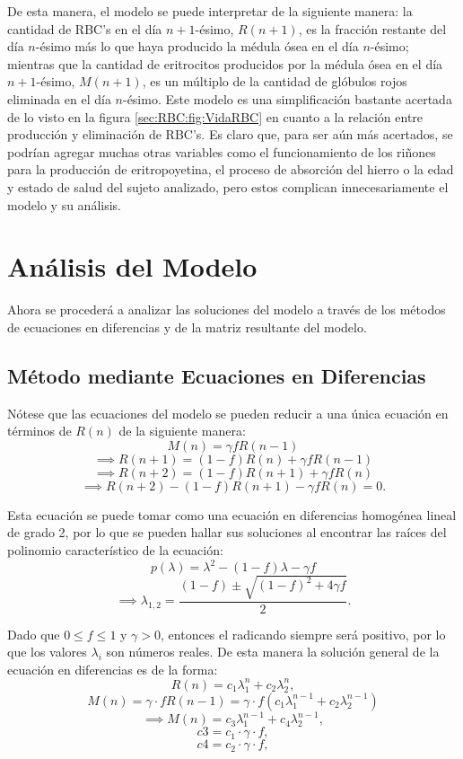 De esta manera, el modelo se puede interpretar de la siguiente manera: la cantidad de RBC's en el día $n+1$-ésimo, $R(n+1)$, es la fracción restante del día $n$-ésimo más lo que haya producido la médula ósea en el día $n$-ésimo; mientras que la cantidad de eritrocitos producidos por la médula ósea en el día $n+1$-ésimo, $M(n+1)$, es un múltiplo de la cantidad de glóbulos rojos eliminada en el día $n$-ésimo. Este modelo es una simplificación bastante acertada de lo visto en la figura \ref{sec:RBC:fig:VidaRBC} en cuanto a la relación entre producción y eliminación de RBC's. Es claro que, para ser aún más acertados, se podrían agregar muchas otras variables como el funcionamiento de los riñones para la producción de eritropoyetina, el proceso de absorción del hierro o la edad y estado de salud del sujeto analizado, pero estos complican innecesariamente el modelo y su análisis.

\section{Análisis del Modelo}\label{sec:modelo:analisis}

Ahora se procederá a analizar las soluciones del modelo a través de los métodos de ecuaciones en diferencias y de la matriz resultante del modelo.

\subsection{Método mediante Ecuaciones en Diferencias}

Nótese que las ecuaciones del modelo se pueden reducir a una única ecuación en términos de $R(n)$ de la siguiente manera:
$$M(n)=\gamma f R(n-1)$$
$$\implies R(n+1)=(1-f)R(n)+\gamma f R(n-1)$$
$$\implies R(n+2)=(1-f)R(n+1)+\gamma f R(n)$$
$$\implies R(n+2)-(1-f)R(n+1)-\gamma f R(n)=0.$$

Esta ecuación se puede tomar como una ecuación en diferencias homogénea lineal de grado 2, por lo que se pueden hallar sus soluciones al encontrar las raíces del polinomio característico de la ecuación:
$$p(\lambda)=\lambda^2-(1-f)\lambda-\gamma f$$
$$\implies \lambda_{1,2}=\dfrac{(1-f)\pm\sqrt{(1-f)^2+4\gamma f}}{2}.$$

Dado que $0\leq f \leq 1$ y $\gamma > 0$, entonces el radicando siempre será positivo, por lo que los valores $\lambda_{i}$ son números reales. De esta manera la solución general de la ecuación en diferencias es de la forma:
$$R(n)=c_1 \lambda_1^n+ c_2 \lambda_2^n,$$
$$M(n)=\gamma \cdot f R(n-1)= \gamma \cdot f(c_1 \lambda_1^{n-1}+ c_2 \lambda_2^{n-1})$$
$$\implies M(n)=c_3 \lambda_1^{n-1}+ c_4 \lambda_2^{n-1},$$
$$c3 = c_1\cdot \gamma \cdot f,$$
$$c4 = c_2\cdot \gamma \cdot f,$$

